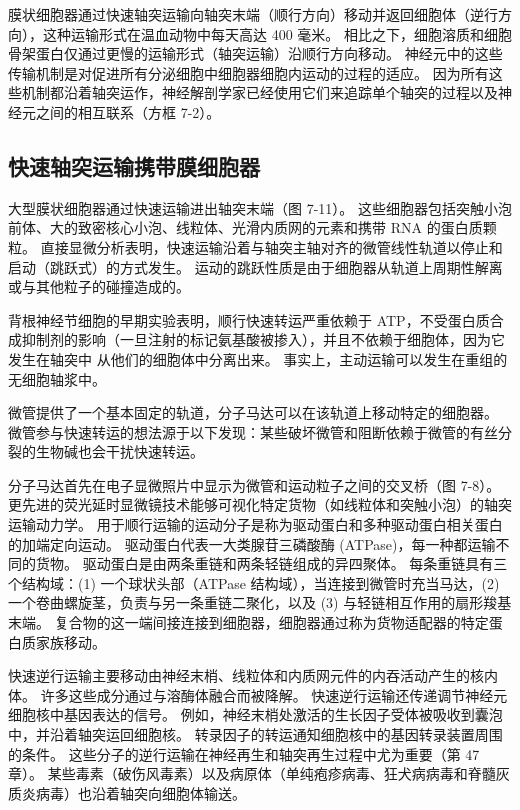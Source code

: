 膜状细胞器通过快速轴突运输向轴突末端（顺行方向）移动并返回细胞体（逆行方向），这种运输形式在温血动物中每天高达 400 毫米。 相比之下，细胞溶质和细胞骨架蛋白仅通过更慢的运输形式（轴突运输）沿顺行方向移动。 神经元中的这些传输机制是对促进所有分泌细胞中细胞器细胞内运动的过程的适应。 因为所有这些机制都沿着轴突运作，神经解剖学家已经使用它们来追踪单个轴突的过程以及神经元之间的相互联系（方框 7-2）。

\subsection{快速轴突运输携带膜细胞器}

大型膜状细胞器通过快速运输进出轴突末端（图 7-11）。 这些细胞器包括突触小泡前体、大的致密核心小泡、线粒体、光滑内质网的元素和携带 RNA 的蛋白质颗粒。 直接显微分析表明，快速运输沿着与轴突主轴对齐的微管线性轨道以停止和启动（跳跃式）的方式发生。 运动的跳跃性质是由于细胞器从轨道上周期性解离或与其他粒子的碰撞造成的。

背根神经节细胞的早期实验表明，顺行快速转运严重依赖于 ATP，不受蛋白质合成抑制剂的影响（一旦注射的标记氨基酸被掺入），并且不依赖于细胞体，因为它发生在轴突中 从他们的细胞体中分离出来。 事实上，主动运输可以发生在重组的无细胞轴浆中。

微管提供了一个基本固定的轨道，分子马达可以在该轨道上移动特定的细胞器。 微管参与快速转运的想法源于以下发现：某些破坏微管和阻断依赖于微管的有丝分裂的生物碱也会干扰快速转运。

分子马达首先在电子显微照片中显示为微管和运动粒子之间的交叉桥（图 7-8）。 更先进的荧光延时显微镜技术能够可视化特定货物（如线粒体和突触小泡）的轴突运输动力学。 用于顺行运输的运动分子是称为驱动蛋白和多种驱动蛋白相关蛋白的加端定向运动。 驱动蛋白代表一大类腺苷三磷酸酶 (ATPase)，每一种都运输不同的货物。 驱动蛋白是由两条重链和两条轻链组成的异四聚体。 每条重链具有三个结构域：(1) 一个球状头部（ATPase 结构域），当连接到微管时充当马达，(2) 一个卷曲螺旋茎，负责与另一条重链二聚化，以及 (3) 与轻链相互作用的扇形羧基末端。 复合物的这一端间接连接到细胞器，细胞器通过称为货物适配器的特定蛋白质家族移动。

快速逆行运输主要移动由神经末梢、线粒体和内质网元件的内吞活动产生的核内体。 许多这些成分通过与溶酶体融合而被降解。 快速逆行运输还传递调节神经元细胞核中基因表达的信号。 例如，神经末梢处激活的生长因子受体被吸收到囊泡中，并沿着轴突运回细胞核。 转录因子的转运通知细胞核中的基因转录装置周围的条件。 这些分子的逆行运输在神经再生和轴突再生过程中尤为重要（第 47 章）。 某些毒素（破伤风毒素）以及病原体（单纯疱疹病毒、狂犬病病毒和脊髓灰质炎病毒）也沿着轴突向细胞体输送。

